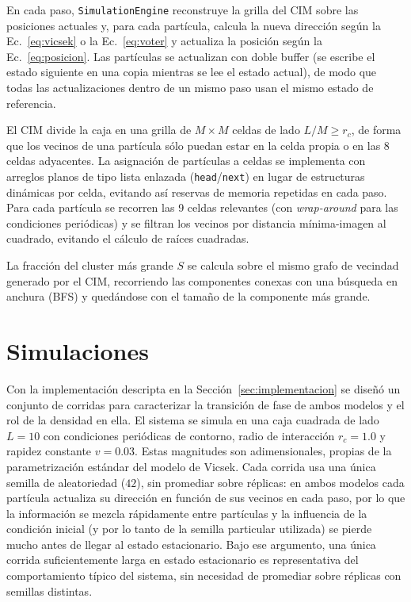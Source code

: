 \documentclass[11pt,a4paper]{article}
\begin{document}
En cada paso, \texttt{SimulationEngine} reconstruye la grilla del CIM sobre
las posiciones actuales y, para cada partícula, calcula la nueva dirección
según la Ec.~\eqref{eq:vicsek} o la Ec.~\eqref{eq:voter} y actualiza la
posición según la Ec.~\eqref{eq:posicion}. Las partículas se actualizan con
doble buffer (se escribe el estado siguiente en una copia mientras se lee el
estado actual), de modo que todas las actualizaciones dentro de un mismo
paso usan el mismo estado de referencia.

El CIM divide la caja en una grilla de $M \times M$ celdas de lado
$L/M \geq r_c$, de forma que los vecinos de una partícula sólo puedan estar
en la celda propia o en las 8 celdas adyacentes. La asignación de partículas
a celdas se implementa con arreglos planos de tipo lista enlazada
(\texttt{head}/\texttt{next}) en lugar de estructuras dinámicas por celda,
evitando así reservas de memoria repetidas en cada paso. Para cada partícula
se recorren las 9 celdas relevantes (con \emph{wrap-around} para las
condiciones periódicas) y se filtran los vecinos por distancia mínima-imagen
al cuadrado, evitando el cálculo de raíces cuadradas.

La fracción del cluster más grande $S$ se calcula sobre el mismo grafo de
vecindad generado por el CIM, recorriendo las componentes conexas con una
búsqueda en anchura (BFS) y quedándose con el tamaño de la componente más
grande.

\section{Simulaciones}
\label{sec:simulaciones}

Con la implementación descripta en la Sección~\ref{sec:implementacion} se
diseñó un conjunto de corridas para caracterizar la transición de fase de
ambos modelos y el rol de la densidad en ella. El sistema se simula en una
caja cuadrada de lado $L = 10$ con condiciones periódicas de contorno,
radio de interacción $r_c = 1.0$ y rapidez constante $v = 0.03$. Estas magnitudes son adimensionales, propias de la
parametrización estándar del modelo de Vicsek. Cada corrida usa una única
semilla de aleatoriedad ($42$), sin promediar sobre réplicas: en ambos
modelos cada partícula actualiza su dirección en función de sus vecinos en
cada paso, por lo que la información se mezcla rápidamente entre
partículas y la influencia de la condición inicial (y por lo tanto de la
semilla particular utilizada) se pierde mucho antes de llegar al estado
estacionario. Bajo ese argumento, una única corrida suficientemente larga
en estado estacionario es representativa del comportamiento típico del
sistema, sin necesidad de promediar sobre réplicas con semillas distintas.
\end{document}
